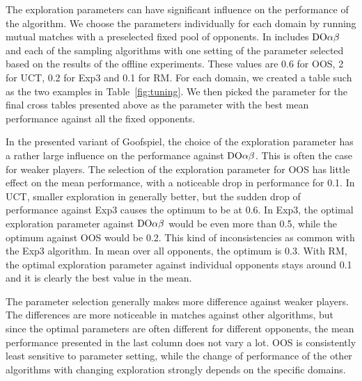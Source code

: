 The exploration parameters can have significant influence on the performance of the algorithm.
We choose the parameters individually for each domain by running mutual matches with a preselected fixed pool of opponents.
In includes $\textrm{DO}\alpha\beta$ and each of the sampling algorithms with one setting of the parameter selected based on the results of the offline experiments.
These values are 0.6 for OOS, 2 for UCT, 0.2 for Exp3 and 0.1 for RM.
For each domain, we created a table such as the two examples in Table~\ref{fig:tuning}.
We then picked the parameter for the final cross tables presented above as the parameter with the best mean performance against all the fixed opponents.

In the presented variant of Goofspiel, the choice of the exploration parameter has a rather large influence on the performance against $\textrm{DO}\alpha\beta$. This is often the case for weaker players.
The selection of the exploration parameter for OOS has little effect on the mean performance, with a noticeable drop in performance for 0.1.
In UCT, smaller exploration in generally better, but the sudden drop of performance against Exp3 causes the optimum to be at 0.6.
In Exp3, the optimal exploration parameter against $\textrm{DO}\alpha\beta$ would be even more than 0.5, while the optimum against OOS would be 0.2. This kind of inconsistencies as common with the Exp3 algorithm. In mean over all opponents, the optimum is 0.3.
With RM, the optimal exploration parameter against individual opponents stays around 0.1 and it is clearly the best value in the mean.

The parameter selection generally makes more difference against weaker players.
The differences are more noticeable in matches against other algorithms, but since the optimal parameters are often different for different opponents, the mean performance presented in the last column does not vary a lot. OOS is consistently least sensitive to parameter setting, while the change of performance of the other algorithms with changing exploration strongly depends on the specific domains.

